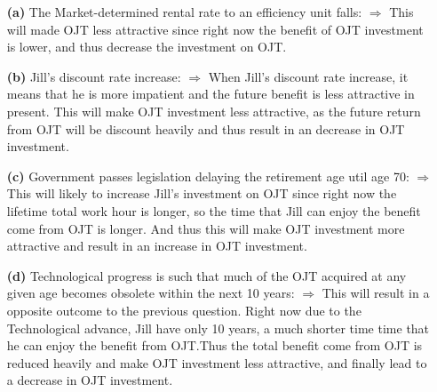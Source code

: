 \documentclass[12pt]{article}
\begin{document}
\begin{enumerate}
    \begin{enumerate}
        \item[\textbf{(a)}]
        The Market-determined rental rate to an efficiency unit falls: \newline
        $\Rightarrow$ This will made OJT less attractive since right now the benefit of OJT investment is lower, and thus
        decrease the investment on OJT.\@
        \item[\textbf{(b)}]
        Jill's discount rate increase: \newline
        $\Rightarrow$ When Jill's discount rate increase, it means that he is more impatient and the future
        benefit is less attractive in present. This will make OJT investment less attractive, as the future return from OJT 
        will be discount heavily and thus result in an decrease in OJT investment.
        \item[\textbf{(c)}]
        Government passes legislation delaying the retirement age util age 70: \newline
        $\Rightarrow$ This will likely to increase Jill's investment on OJT since right now the lifetime total work hour
        is longer, so the time that Jill can enjoy the benefit come from OJT is longer. And thus this will make OJT investment
        more attractive and result in an increase in OJT investment.
        \item[\textbf{(d)}]
        Technological progress is such that much of the OJT acquired at any given age becomes obsolete within the next 10 years: \newline
        $\Rightarrow$ This will result in a opposite outcome to the previous question. Right now due to the Technological advance, Jill have only 10 years, a much shorter time
        time that he can enjoy the benefit from OJT.\@ Thus the total benefit come from OJT is reduced heavily and make OJT investment less attractive, and finally lead to 
        a decrease in OJT investment.
    \end{enumerate}
    

\end{enumerate}
\end{document}
